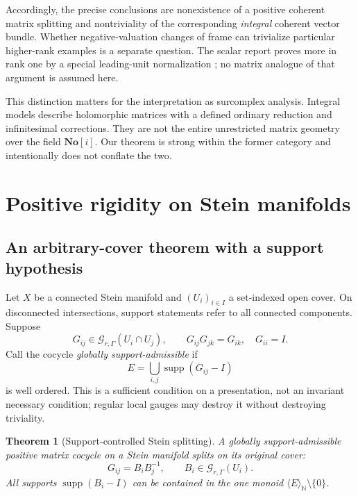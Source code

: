 \documentclass[11pt,letterpaper]{article}
\newtheorem{theorem}{Theorem}[section]
\theoremstyle{definition}
\theoremstyle{remark}
\newcommand{\N}{\mathbb N}
\newcommand{\No}{\mathbf{No}}
\newcommand{\supp}{\operatorname{supp}}
\newcommand{\angles}[1]{\langle #1\rangle_{\N}}
\numberwithin{equation}{section}
\begin{document}
Accordingly, the precise conclusions are nonexistence of a positive coherent matrix splitting and nontriviality of the corresponding \emph{integral} coherent vector bundle. Whether negative-valuation changes of frame can trivialize particular higher-rank examples is a separate question. The scalar report proves more in rank one by a special leading-unit normalization \cite{RepoGlobal}; no matrix analogue of that argument is assumed here.

This distinction matters for the interpretation as surcomplex analysis. Integral models describe holomorphic matrices with a defined ordinary reduction and infinitesimal corrections. They are not the entire unrestricted matrix geometry over the field $\No[i]$. Our theorem is strong within the former category and intentionally does not conflate the two.

\section{Positive rigidity on Stein manifolds}\label{sec:Stein}

\subsection{An arbitrary-cover theorem with a support hypothesis}

Let $X$ be a connected Stein manifold and $(U_i)_{i\in I}$ a set-indexed open cover. On disconnected intersections, support statements refer to all connected components. Suppose
\[
 G_{ij}\in\mathscr G_{r,\Gamma}(U_i\cap U_j),
 \qquad G_{ij}G_{jk}=G_{ik},\quad G_{ii}=I.
\]
Call the cocycle \emph{globally support-admissible} if
\begin{equation}\label{eq:Ecover}
 E=\bigcup_{i,j}\supp(G_{ij}-I)
\end{equation}
is well ordered. This is a sufficient condition on a presentation, not an invariant necessary condition; regular local gauges may destroy it without destroying triviality.

\begin{theorem}[Support-controlled Stein splitting]\label{thm:Stein}
A globally support-admissible positive matrix cocycle on a Stein manifold splits on its original cover:
\[
 G_{ij}=B_iB_j^{-1},
 \qquad B_i\in\mathscr G_{r,\Gamma}(U_i).
\]
All supports $\supp(B_i-I)$ can be contained in the one monoid $\angles E\setminus\{0\}$.
\end{theorem}
\end{document}
